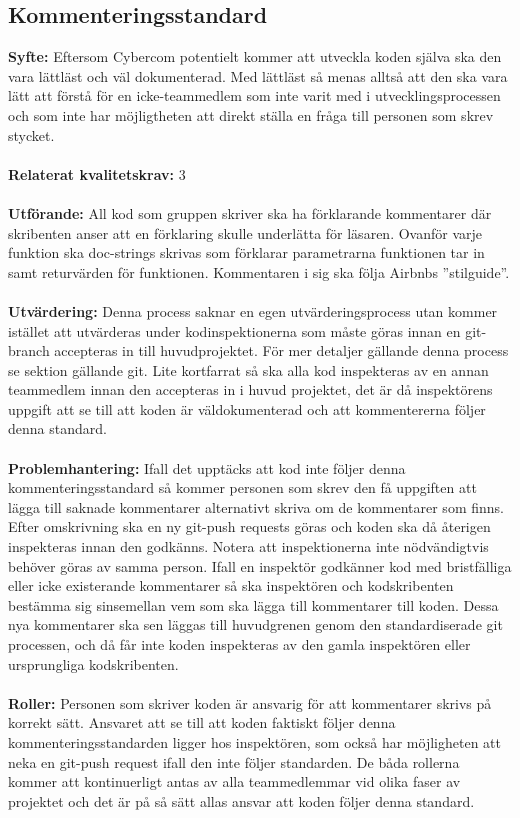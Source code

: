 \documentclass[10pt]{article}
\begin{document}
	\subsection{Kommenteringsstandard}
	\textbf{Syfte:}	Eftersom Cybercom potentielt kommer att utveckla koden själva ska den vara lättläst och väl dokumenterad. Med lättläst så menas alltså att den ska vara lätt att förstå för en icke-teammedlem som inte varit med i utvecklingsprocessen och som inte har möjligtheten att direkt ställa en fråga till personen som skrev stycket.
	\\\\
	\textbf{Relaterat kvalitetskrav:} 3 
	\\\\
	\textbf{Utförande:} All kod som gruppen skriver ska ha förklarande kommentarer där skribenten anser att en förklaring skulle underlätta för läsaren. Ovanför varje funktion ska doc-strings skrivas som förklarar parametrarna funktionen tar in samt returvärden för funktionen.
	Kommentaren i sig ska följa Airbnbs ''stilguide''\cite{bib-airbnb}.
	\\\\
	\textbf{Utvärdering:} Denna process saknar en egen utvärderingsprocess utan kommer istället att utvärderas under kodinspektionerna som måste göras innan en git-branch accepteras in till huvudprojektet\cite{bib-gitguide}. För mer detaljer gällande denna process se sektion gällande git. Lite kortfarrat så ska alla kod inspekteras av en annan teammedlem innan den accepteras in i huvud projektet, det är då inspektörens uppgift att se till att koden är väldokumenterad och att kommentererna följer denna standard. 
	\\\\
	\textbf{Problemhantering:} Ifall det upptäcks att kod inte följer denna kommenteringsstandard så kommer personen som skrev den få uppgiften att lägga till saknade kommentarer alternativt skriva om de kommentarer som finns. Efter omskrivning ska en ny git-push requests göras och koden ska då återigen inspekteras innan den godkänns. Notera att inspektionerna inte nödvändigtvis behöver göras av samma person.
	Ifall en inspektör godkänner kod med bristfälliga eller icke existerande kommentarer så ska inspektören och kodskribenten bestämma sig sinsemellan vem som ska lägga till kommentarer till koden. Dessa nya kommentarer ska sen läggas till huvudgrenen genom den standardiserade git processen, och då får inte koden inspekteras av den gamla inspektören eller ursprungliga kodskribenten.
	\\\\
	\textbf{Roller:} Personen som skriver koden är ansvarig för att kommentarer skrivs på korrekt sätt. Ansvaret att se till att koden faktiskt följer denna kommenteringsstandarden ligger hos inspektören, som också har möjligheten att neka en git-push request ifall den inte följer standarden. De båda rollerna kommer att kontinuerligt antas av alla teammedlemmar vid olika faser av projektet och det är på så sätt allas ansvar att koden följer denna standard.
	\\
	
\end{document}
